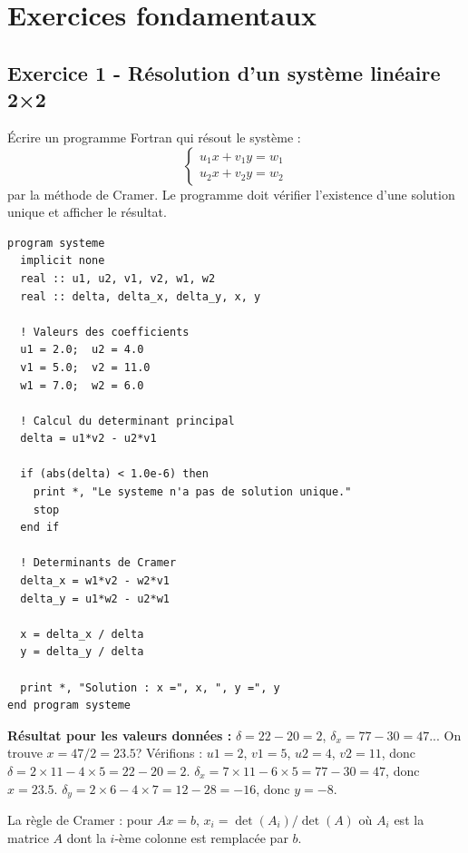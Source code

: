 \documentclass[12pt,a4paper]{article}
\begin{document}
\newpage
\section{Exercices fondamentaux}

\subsection*{Exercice 1 - Résolution d'un système linéaire 2×2 \niveau{\facile}}

\begin{boiteexercice}
Écrire un programme Fortran qui résout le système :
\[
\begin{cases}u_1 x + v_1 y = w_1 \\ u_2 x + v_2 y = w_2\end{cases}
\]
par la méthode de Cramer. Le programme doit vérifier l'existence d'une solution unique et afficher le résultat.
\end{boiteexercice}

\begin{boitecorrige}
\begin{lstlisting}
program systeme
  implicit none
  real :: u1, u2, v1, v2, w1, w2
  real :: delta, delta_x, delta_y, x, y

  ! Valeurs des coefficients
  u1 = 2.0;  u2 = 4.0
  v1 = 5.0;  v2 = 11.0
  w1 = 7.0;  w2 = 6.0

  ! Calcul du determinant principal
  delta = u1*v2 - u2*v1

  if (abs(delta) < 1.0e-6) then
    print *, "Le systeme n'a pas de solution unique."
    stop
  end if

  ! Determinants de Cramer
  delta_x = w1*v2 - w2*v1
  delta_y = u1*w2 - u2*w1

  x = delta_x / delta
  y = delta_y / delta

  print *, "Solution : x =", x, ", y =", y
end program systeme
\end{lstlisting}

\textbf{Résultat pour les valeurs données :} $\delta = 22-20=2$, $\delta_x = 77-30=47$... On trouve $x=47/2=23.5$? Vérifions : $u1=2$, $v1=5$, $u2=4$, $v2=11$, donc $\delta=2\times11-4\times5=22-20=2$. $\delta_x=7\times11-6\times5=77-30=47$, donc $x=23.5$. $\delta_y=2\times6-4\times7=12-28=-16$, donc $y=-8$.

La règle de Cramer : pour $Ax=b$, $x_i = \det(A_i)/\det(A)$ où $A_i$ est la matrice $A$ dont la $i$-ème colonne est remplacée par $b$.
\end{boitecorrige}
\end{document}
